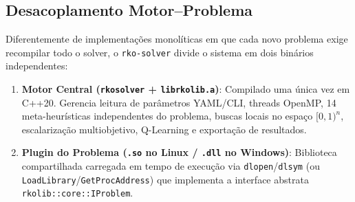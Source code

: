 \documentclass[11pt,a4paper]{article}
\begin{document}
\subsection{Desacoplamento Motor--Problema}

Diferentemente de implementações monolíticas em que cada novo problema exige recompilar todo o solver, o \texttt{rko-solver} divide o sistema em dois binários independentes:
\begin{enumerate}[leftmargin=*]
  \item \textbf{Motor Central (\texttt{rkosolver} + \texttt{librkolib.a})}: Compilado uma única vez em C++20. Gerencia leitura de parâmetros YAML/CLI, threads OpenMP, 14 meta-heurísticas independentes do problema, buscas locais no espaço $[0,1)^n$, escalarização multiobjetivo, Q-Learning e exportação de resultados.
  \item \textbf{Plugin do Problema (\texttt{.so} no Linux / \texttt{.dll} no Windows)}: Biblioteca compartilhada carregada em tempo de execução via \texttt{dlopen}/\texttt{dlsym} (ou \texttt{LoadLibrary}/\texttt{GetProcAddress}) que implementa a interface abstrata \texttt{rkolib::core::IProblem}.
\end{enumerate}
\end{document}

